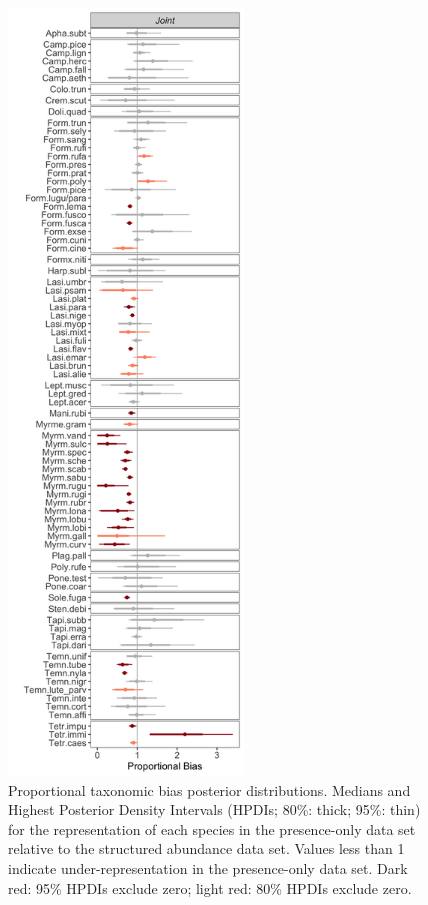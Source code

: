 \documentclass[preprint,review,times,12pt,3p]{elsarticle}
\begin{document}
\begin{figure}
	\centering\includegraphics[height=8in]{../../../ms/1_Ecography/1/figs/D.png}
	\caption{\label{fig:D} Proportional taxonomic bias posterior distributions. Medians and Highest Posterior Density Intervals (HPDIs; 80\%: thick; 95\%: thin) for the representation of each species in the presence-only data set relative to the structured abundance data set. Values less than 1 indicate under-representation in the presence-only data set. Dark red: 95\% HPDIs exclude zero; light red: 80\% HPDIs exclude zero. }
\end{figure}
\end{document}
